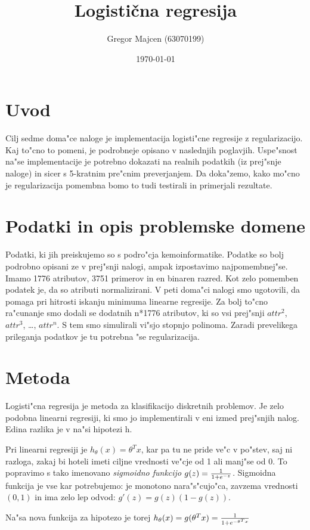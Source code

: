 \documentclass[a4paper,11pt]{article}
\title{Logisti\v{c}na regresija}
\author{Gregor Majcen (63070199)}
\date{\today}
\begin{document}
\maketitle

\section{Uvod}
Cilj sedme doma"ce naloge je implementacija logisti"cne regresije z regularizacijo. Kaj to"cno to pomeni, je podrobneje opisano v naslednjih poglavjih. Uspe"snost na"se implementacije je potrebno dokazati na realnih podatkih (iz prej"snje naloge) in sicer s 5-kratnim pre"cnim preverjanjem. Da doka"zemo, kako mo"cno je regularizacija pomembna bomo to tudi testirali in primerjali rezultate. 

\section{Podatki in opis problemske domene}
Podatki, ki jih preiskujemo so s podro"cja kemoinformatike. Podatke so bolj podrobno opisani ze v prej"snji nalogi, ampak izpostavimo najpomembnej"se. Imamo 1776 atributov, 3751 primerov in en binaren razred. Kot zelo pomemben podatek je, da so atributi normalizirani. V peti doma"ci nalogi smo ugotovili, da pomaga pri hitrosti iskanju minimuma linearne regresije. Za bolj to"cno ra"cunanje smo dodali se dodatnih n*1776 atributov, ki so vsi prej"snji $attr^2$, $attr^3$, \ldots, $attr^n$. S tem smo simulirali vi"sjo stopnjo polinoma.  Zaradi prevelikega prileganja podatkov je tu potrebna "se regularizacija.

\section{Metoda}
Logisti"cna regresija je metoda za klasifikacijo diskretnih problemov. Je zelo podobna linearni regresiji, ki smo jo implementirali v eni izmed prej"snjih nalog. Edina razlika je v na"si hipotezi h. 

Pri linearni regresiji je $h_\theta(x) = \theta^Tx$, kar pa tu ne pride ve"c v po"stev, saj ni razloga, zakaj bi hoteli imeti ciljne vrednosti ve"cje od 1 ali manj"se od 0. To popravimo s tako imenovano \textit{sigmoidno funkcijo} $g(z) = {1\over{1+e^{-z}}}$. Sigmoidna funkcija je vse kar potrebujemo: je monotono nara"s"cujo"ca, zavzema vrednosti $(0,1)$ in ima zelo lep odvod: $g'(z) = g(z)(1-g(z))$.

Na"sa nova funkcija za hipotezo je torej $h_\theta(x) = g(\theta^Tx) = {1\over{1+e^{-\theta^Tx}}}$
\end{document}
